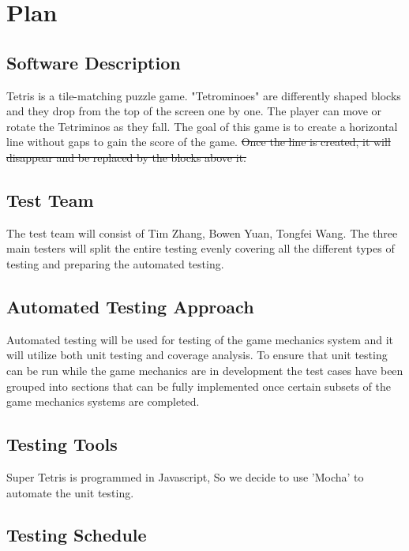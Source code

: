 \documentclass[12pt, titlepage]{article}
\begin{document}
\section{Plan}
	
\subsection{Software Description}
\tab Tetris is a tile-matching puzzle game. "Tetrominoes" are differently shaped blocks and they drop from the top of the screen one by one. The player can move or rotate the Tetriminos as they fall. The goal of this game is to create a horizontal line without gaps {\color{red} to gain the score of the game.}
\st{Once the line is created, it will disappear and be replaced by the blocks above it.}

\subsection{Test Team}
\tab The test team will consist of Tim Zhang, Bowen Yuan, Tongfei Wang. The three main testers will split the entire testing evenly covering all the different types of testing and preparing the automated testing.

\subsection{Automated Testing Approach}
\tab Automated testing will be used for testing of the game mechanics system and {\color{red} it} will utilize both unit testing and coverage analysis. To ensure that unit testing can be run while the game mechanics are in development the test cases have been grouped into sections that can be fully implemented once certain subsets of the game mechanics systems are completed.

\subsection{Testing Tools}
\tab Super Tetris is programmed in Javascript, So we decide to use 'Mocha' to automate the unit testing.

\subsection{Testing Schedule}
\end{document}
